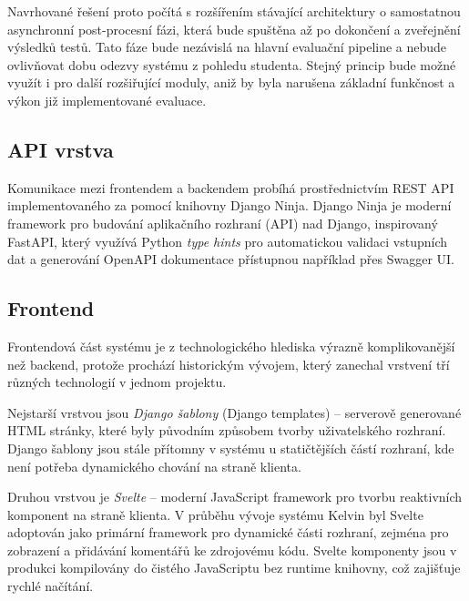 Navrhované řešení proto počítá s rozšířením stávající architektury o samostatnou asynchronní post-procesní fázi, která bude spuštěna až po dokončení a zveřejnění výsledků testů.
Tato fáze bude nezávislá na hlavní evaluační pipeline a nebude ovlivňovat dobu odezvy systému z pohledu studenta.
Stejný princip bude možné využít i pro další rozšiřující moduly, aniž by byla narušena základní funkčnost a výkon již implementované evaluace.


\subsection{API vrstva}
\label{subsec:kelvin-api}

Komunikace mezi frontendem a backendem probíhá prostřednictvím REST API implementovaného za pomocí knihovny Django Ninja.
Django Ninja je moderní framework pro budování aplikačního rozhraní (API) nad Django, inspirovaný FastAPI, který využívá Python \textit{type hints} pro automatickou validaci vstupních dat a generování OpenAPI dokumentace přístupnou například přes Swagger UI\@.

\subsection{Frontend}
\label{subsec:kelvin-frontend}

Frontendová část systému je z technologického hlediska výrazně komplikovanější než backend, protože prochází historickým vývojem, který zanechal vrstvení tří různých technologií v jednom projektu.

Nejstarší vrstvou jsou \textit{Django šablony} (Django templates) -- serverově generované HTML stránky, které byly původním způsobem tvorby uživatelského rozhraní.
Django šablony jsou stále přítomny v systému u statičtějších částí rozhraní, kde není potřeba dynamického chování na straně klienta.

Druhou vrstvou je \textit{Svelte} -- moderní JavaScript framework pro tvorbu reaktivních komponent na straně klienta.
V průběhu vývoje systému Kelvin byl Svelte adoptován jako primární framework pro dynamické části rozhraní, zejména pro zobrazení a přidávání komentářů ke zdrojovému kódu.
Svelte komponenty jsou v produkci kompilovány do čistého JavaScriptu bez runtime knihovny, což zajišťuje rychlé načítání.

